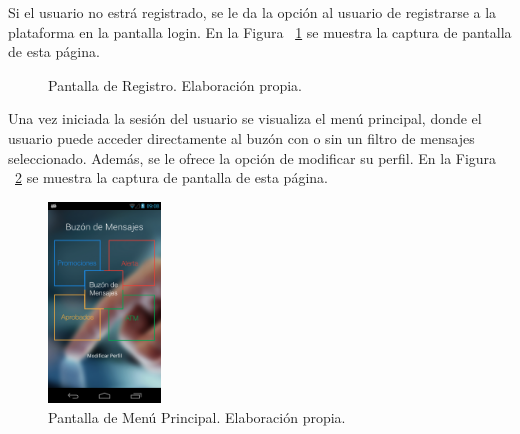 Si el usuario no estrá registrado, se le da la opción al usuario de registrarse a la plataforma en la pantalla login. En la Figura ~\ref{fig:registro} se muestra la captura de pantalla de esta página.
\begin{figure}[htp]
  \centering
  \quad
  \caption{Pantalla de Registro. Elaboración propia.}\label{fig:registro}
\end{figure} 

Una vez iniciada la sesión del usuario se visualiza el menú principal, donde el usuario puede acceder directamente al buzón con o sin un filtro de mensajes seleccionado. Además, se le ofrece la opción de modificar su perfil. En la Figura ~\ref{fig:MenuPrincipal} se muestra la captura de pantalla de esta página.
\begin{figure}[htp]
  \centering
  \includegraphics[width=3cm,type=png,ext=.png,read=.png,angle=0,origin=c]{imagenes/pantalla3}
  \caption{Pantalla de Menú Principal. Elaboración propia.}
  \label{fig:MenuPrincipal}
\end{figure} 

